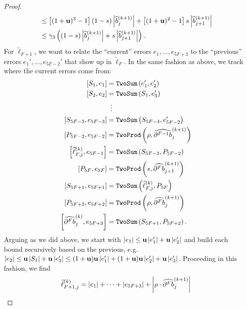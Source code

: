 \begin{proof}
\begin{align}
&\leq \left[(1 + \mathbf{u})^3 - 1\right] (1 - s) \left|
  \widehat{b}_j^{(k + 1)}\right| + \left[(1 + \mathbf{u})^2 - 1\right] s \left|
  \widehat{b}_{j + 1}^{(k + 1)}\right| \\
&\leq \gamma_3 \left((1 - s) \left|\widehat{b}_j^{(k + 1)}\right| +
  s \left|\widehat{b}_{j + 1}^{(k + 1)}\right|\right).
\end{align}
For \(\widetilde{\ell}_{F + 1}\), we want to relate the ``current'' errors
\(e_1, \ldots, e_{5F + 3}\) to the ``previous'' errors \(e_1',
\ldots, e_{5F - 2}'\) that show up in \(\widetilde{\ell}_F\). In the same
fashion as above, we track where the current errors come from:
\begin{align}
\left[S_1, e_1\right] &= \mathtt{TwoSum}\left(e_1', e_2'\right) \\
\left[S_2, e_2\right] &= \mathtt{TwoSum}\left(S_1, e_3'\right) \\
&\mathrel{\makebox[\widthof{=}]{\vdots}} \nonumber \\
\left[S_{5F - 3}, e_{5F - 3}\right] &=
  \mathtt{TwoSum}\left(S_{5F - 4}, e_{5F - 2}'\right) \\
\left[P_{5F - 2}, e_{5F - 2}\right] &= \mathtt{TwoProd}\left(\rho,
  \cdb{F - 1}_j^{(k + 1)}\right) \\
\left[\widehat{\ell}_{F, j}^{(k)}, e_{5F - 1}\right] &=
  \mathtt{TwoSum}\left(S_{5F - 3}, P_{5F - 2}\right) \\
\left[P_{5F}, e_{5F}\right] &= \mathtt{TwoProd}\left(s,
  \cdb{F}_{j + 1}^{(k + 1)}\right) \\
\left[S_{5F + 1}, e_{5F + 1}\right] &=
  \mathtt{TwoSum}\left(\widehat{\ell}_{F, j}^{(k)}, P_{5F}\right) \\
\left[P_{5F + 2}, e_{5F + 2}\right] &= \mathtt{TwoProd}\left(\rho,
  \cdb{F}_j^{(k + 1)}\right) \\
\left[\cdb{F}_j^{(k)}, e_{5F + 3}\right] &= \mathtt{TwoSum}\left(
  S_{5F + 1}, P_{5F + 2}\right).
\end{align}
Arguing as we did above, we start with
\(\left|e_1\right| \leq \mathbf{u} \left|e_1'\right| + \mathbf{u} \left|e_2'\right|\)
and build each bound recursively based on the previous, e.g.
\(\left|e_2\right| \leq \mathbf{u} \left|S_1\right| + \mathbf{u} \left|e_3'\right| \leq
(1 + \mathbf{u}) \mathbf{u} \left|e_1'\right| + (1 + \mathbf{u}) \mathbf{u} \left|e_2'\right| +
\mathbf{u} \left|e_3'\right|\). Proceeding in this fashion, we find
\begin{align}
\widetilde{\ell}_{F + 1, j}^{(k)} &= \left|e_1\right| + \cdots +
  \left|e_{5F + 3}\right| + \left|\rho \cdot \cdb{F}_j^{(k + 1)}\right| \\

\end{align}
\end{proof}
